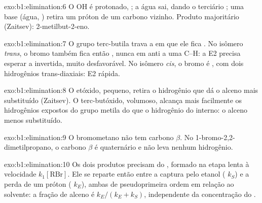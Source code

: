\begin{solution}{exo:b1:elimination:6}
O OH é protonado, ; a água sai, dando o  terciário
; uma base (água, ) retira um próton de um
carbono vizinho. Produto majoritário (Zaitsev): 2-metilbut-2-eno.
\end{solution}

\begin{solution}{exo:b1:elimination:7}
O grupo terc-butila trava a  em que ele fica . No
isômero \textit{trans}, o bromo também fica então , nunca em
anti a uma C--H: a E2 precisa esperar a  invertida, muito
desfavorável. No isômero \textit{cis}, o bromo é , com dois
hidrogênios trans-diaxiais: E2 rápida.
\end{solution}

\begin{solution}{exo:b1:elimination:8}
O etóxido, pequeno, retira o hidrogênio que dá o alceno mais
substituído (Zaitsev). O terc-butóxido, volumoso, alcança mais
facilmente os hidrogênios expostos do grupo metila do que o hidrogênio
do  interno: o alceno menos substituído.
\end{solution}

\begin{solution}{exo:b1:elimination:9}
O bromometano não tem carbono $\beta$. No 1-bromo-2,2-dimetilpropano, o
carbono $\beta$ é quaternário e não leva nenhum hidrogênio.
\end{solution}

\begin{solution}{exo:b1:elimination:10}
Os dois produtos precisam do , formado na etapa lenta à
velocidade $k_1[\mathrm{RBr}]$. Ele se reparte então entre a captura
pelo etanol ( $k_S$) e a perda de um próton
( $k_E$), ambas de pseudoprimeira ordem em
relação ao solvente: a fração de alceno é $k_E/(k_E + k_S)$,
independente da concentração do .
\end{solution}

